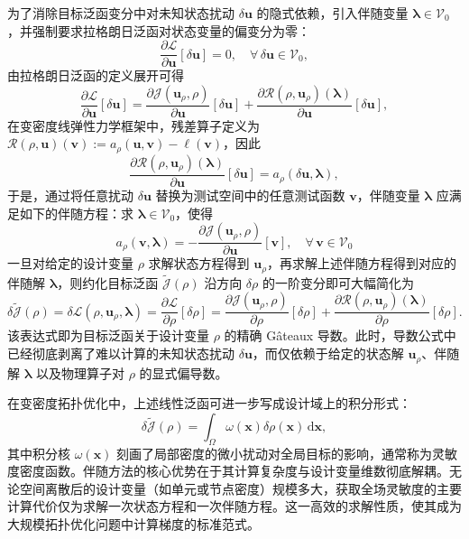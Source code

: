 为了消除目标泛函变分中对未知状态扰动 $\delta\boldsymbol{u}$ 的隐式依赖，引入伴随变量 $\boldsymbol{\lambda}\in\mathcal{V}_0$，并强制要求拉格朗日泛函对状态变量的偏变分为零：
\[
\frac{\partial\mathcal{L}}{\partial\boldsymbol{u}}[\delta\boldsymbol{u}] = 0, \quad \forall\,\delta\boldsymbol{u}\in\mathcal{V}_0,
\]
由拉格朗日泛函的定义展开可得
\[
\frac{\partial\mathcal{L}}{\partial\boldsymbol{u}}[\delta\boldsymbol{u}] = \frac{\partial\mathcal{J}( \boldsymbol{u}_\rho,\rho)}{\partial\boldsymbol{u}}[\delta\boldsymbol{u}] + \frac{\partial\mathcal{R}(\rho,\boldsymbol{u}_\rho)(\boldsymbol\lambda)}{\partial\boldsymbol{u}}[\delta\boldsymbol{u}],
\]
在变密度线弹性力学框架中，残差算子定义为 $\mathcal{R}(\rho,\boldsymbol{u})(\boldsymbol{v}) := a_\rho(\boldsymbol{u},\boldsymbol{v}) - \ell(\boldsymbol{v})$，因此
\[
\frac{\partial\mathcal{R}(\rho,\boldsymbol{u}_\rho)(\boldsymbol\lambda)}{\partial\boldsymbol{u}}[\delta\boldsymbol{u}] = a_\rho(\delta\boldsymbol{u},\boldsymbol{\lambda}),
\]
于是，通过将任意扰动 $\delta\boldsymbol{u}$ 替换为测试空间中的任意测试函数 $\boldsymbol{v}$，伴随变量 $\boldsymbol{\lambda}$ 应满足如下的伴随方程：求 $\boldsymbol{\lambda}\in\mathcal{V}_0$，使得
\[
a_\rho(\boldsymbol{v},\boldsymbol{\lambda}) = -\frac{\partial\mathcal{J}( \boldsymbol{u}_\rho,\rho)}{\partial\boldsymbol{u}}[\boldsymbol{v}],\quad \forall\,\boldsymbol{v}\in\mathcal{V}_0
\]
一旦对给定的设计变量 $\rho$ 求解状态方程得到 $\boldsymbol{u}_\rho$​，再求解上述伴随方程得到对应的伴随解 $\boldsymbol{\lambda}$，则约化目标泛函 $\tilde{\mathcal{J}}(\rho)$ 沿方向 $\delta\rho$ 的一阶变分即可大幅简化为
\[
\delta\tilde{\mathcal{J}}(\rho) = \delta\mathcal{L}(\rho, \boldsymbol{u}_\rho, \boldsymbol{\lambda}) = \frac{\partial\mathcal{L}}{\partial\rho}[\delta\rho] = \frac{\partial\mathcal{J}(\boldsymbol{u}_\rho, \rho)}{\partial\rho}[\delta\rho] + \frac{\partial\mathcal{R}(\rho, \boldsymbol{u}_\rho)(\boldsymbol{\lambda})}{\partial\rho}[\delta\rho].
\]
该表达式即为目标泛函关于设计变量 $\rho$ 的精确 Gâteaux 导数。此时，导数公式中已经彻底剥离了难以计算的未知状态扰动 $\delta\boldsymbol{u}$，而仅依赖于给定的状态解 $\boldsymbol{u}_\rho$、伴随解 $\boldsymbol{\lambda}$ 以及物理算子对 $\rho$ 的显式偏导数。

在变密度拓扑优化中，上述线性泛函可进一步写成设计域上的积分形式：
\[
\delta\tilde{\mathcal{J}}(\rho) = \int_{\Omega} \omega(\boldsymbol{x}) \delta\rho(\boldsymbol{x}) \,\mathrm{d}\boldsymbol{x},
\]
其中积分核 $\omega(\boldsymbol{x})$ 刻画了局部密度的微小扰动对全局目标的影响，通常称为灵敏度密度函数。伴随方法的核心优势在于其计算复杂度与设计变量维数彻底解耦。无论空间离散后的设计变量（如单元或节点密度）规模多大，获取全场灵敏度的主要计算代价仅为求解一次状态方程和一次伴随方程。这一高效的求解性质，使其成为大规模拓扑优化问题中计算梯度的标准范式。


